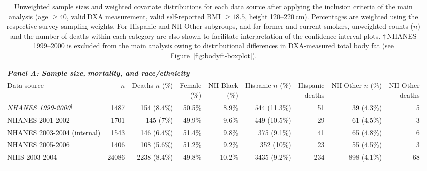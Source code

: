 \begin{table}[htbp]
\centering
\small
\caption{Unweighted sample sizes and weighted covariate distributions
  for each data source after applying the inclusion criteria of the main analysis
  (age $\geq 40$, valid DXA measurement, valid self-reported BMI $\geq 18.5$,
  height 120--220\,cm).
  Percentages are weighted using the respective survey sampling weights.
  For Hispanic and NH-Other subgroups, and for former and current smokers,
  unweighted counts ($n$) and the number of deaths within each category are
  also shown to facilitate interpretation of the confidence-interval plots.
  $\dagger$\,NHANES 1999--2000 is excluded from the main analysis owing to
  distributional differences in DXA-measured total body fat
  (see Figure~\ref{fig:bodyft-boxplot}).}
\label{tab:eda-sample-summary}
\begin{tabular}{lrrrrrrrr}
\toprule
\multicolumn{9}{l}{\textit{Panel A: Sample size, mortality, and race/ethnicity}} \\
\midrule
Data source & $n$ & \makecell{Deaths\\$n$ (\%)} &
\makecell{Female\\(\%)} & \makecell{NH-Black\\(\%)} &
\makecell{Hispanic\\$n$ (\%)} & \makecell{Hispanic\\deaths} &
\makecell{NH-Other\\$n$ (\%)} & \makecell{NH-Other\\deaths} \\
\textit{NHANES 1999-2000}$^{\dagger}$ & 1487 & 154 (8.4\%) & 50.5\% & 8.9\% & 544 (11.3\%) & 51 & 39 (4.3\%) & 5 \\
NHANES 2001-2002 & 1701 & 145 (7\%) & 49.9\% & 9.6\% & 449 (10.5\%) & 29 & 61 (4.5\%) & 3 \\
NHANES 2003-2004 (internal) & 1543 & 146 (6.4\%) & 51.4\% & 9.8\% & 375 (9.1\%) & 41 & 65 (4.8\%) & 6 \\
NHANES 2005-2006 & 1406 & 108 (5.6\%) & 51.2\% & 9.2\% & 352 (10\%) & 23 & 55 (4.5\%) & 3 \\
NHIS 2003-2004 & 24086 & 2238 (8.4\%) & 49.8\% & 10.2\% & 3435 (9.2\%) & 234 & 898 (4.1\%) & 68 \\
\addlinespace
\\[4pt]

\end{tabular}
\end{table}
